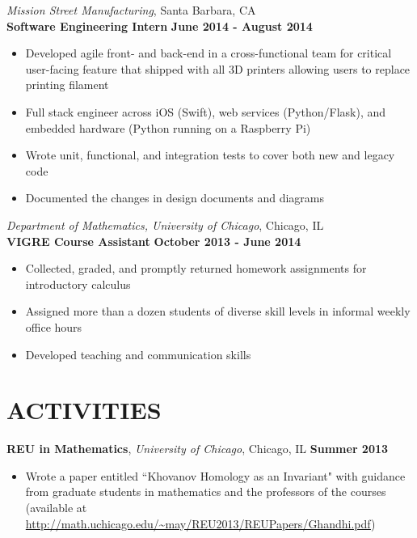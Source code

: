 \documentclass[9pt]{res} %
\begin{document}
\begin{resume}
\textit{Mission Street Manufacturing}, Santa Barbara, CA \\
\textbf{Software Engineering Intern} \hspace*{\fill} \textbf{June 2014 - August 2014}
\begin{itemize}
\item Developed agile front- and back-end in a cross-functional team for critical user-facing feature that shipped with all 3D printers allowing users to replace printing filament
\item Full stack engineer across iOS (Swift), web services (Python/Flask), and embedded hardware (Python running on a Raspberry Pi)
\item Wrote unit, functional, and integration tests to cover both new and legacy code
\item Documented the changes in design documents and diagrams
\end{itemize}

\textit{Department of Mathematics, University of Chicago}, Chicago, IL \\
\textbf{VIGRE Course Assistant}   \hspace*{\fill} \textbf{October 2013 - June 2014}
\begin{itemize} 
\item Collected, graded, and promptly returned homework assignments for introductory calculus
\item Assigned more than a dozen students of diverse skill levels in informal weekly office hours 
\item Developed teaching and communication skills
\end{itemize}

\section{ACTIVITIES} 
\textbf{REU in Mathematics}, \textit{University of Chicago}, Chicago, IL \hspace{\fill} \textbf{Summer 2013}
\begin{itemize}
\item Wrote a paper entitled ``Khovanov Homology as an Invariant" with guidance from graduate students in mathematics and the professors of the courses (available at \url{http://math.uchicago.edu/~may/REU2013/REUPapers/Ghandhi.pdf})
\end{itemize}


\end{resume}
\end{document}
